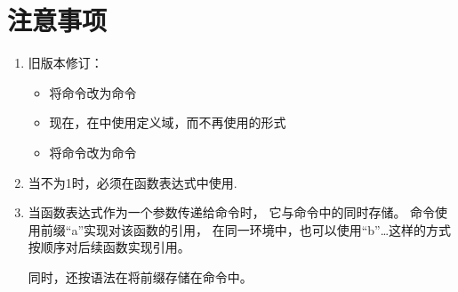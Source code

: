 \documentclass[../main.tex]{subfiles}
\begin{document}
\section{注意事项}

\begin{enumerate}
\item 旧版本修订：
  \begin{itemize}
   \item 将命令改为命令
   \item 现在，在\TIKZ{}中使用定义域，而不再使用的形式
   \item 将命令改为命令
  \end{itemize}

\item 当不为1时，必须在函数表达式中使用.
\item 当函数表达式作为一个参数传递给命令时，
	它与命令中的同时存储。
	命令使用前缀\enquote{a}实现对该函数的引用，
	在同一环境中，也可以使用\enquote{b}\dots{}这样的方式按顺序对后续函数实现引用。

	同时，还按语法在将前缀存储在命令中。


\end{enumerate}
\end{document}
